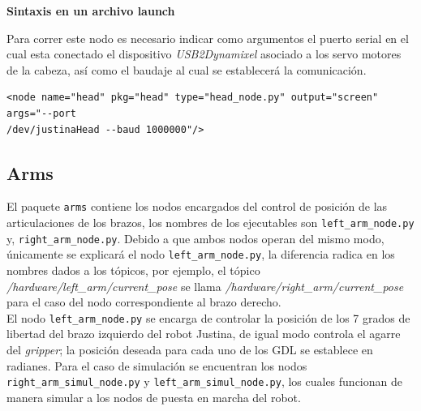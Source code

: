 \documentclass[user_manual.tex]{subfiles}
\begin{document}
\textbf{Sintaxis en un archivo launch}

Para correr este nodo es necesario indicar como argumentos el puerto serial en el cual esta conectado el dispositivo \textit{USB2Dynamixel} asociado a los servo motores de la cabeza, así como el baudaje al cual se establecerá la comunicación.\\
\begin{verbatim}
<node name="head" pkg="head" type="head_node.py" output="screen" args="--port 
/dev/justinaHead --baud 1000000"/>
\end{verbatim}

\subsection{Arms}
El paquete \texttt{arms} contiene los nodos encargados del control de posición de las articulaciones de los brazos, los nombres de los ejecutables son \texttt{left\_arm\_node.py} y, \texttt{right\_arm\_node.py}. Debido a que ambos nodos operan del mismo modo, únicamente se explicará el nodo \texttt{left\_arm\_node.py}, la diferencia radica en los nombres dados a los tópicos, por ejemplo, el tópico \textit{/hardware/left\_arm/current\_pose} se llama \textit{/hardware/right\_arm/current\_pose} para el caso del nodo correspondiente al brazo derecho.\\

El nodo \texttt{left\_arm\_node.py} se encarga de controlar la posición de los 7 grados de libertad del brazo izquierdo del robot Justina, de igual modo controla el agarre del \textit{gripper}; la posición deseada para cada uno de los GDL se establece en radianes. Para el caso de simulación se encuentran los nodos \texttt{right\_arm\_simul\_node.py} y \texttt{left\_arm\_simul\_node.py}, los cuales funcionan de manera simular a los nodos de puesta en marcha del robot.
\end{document}
